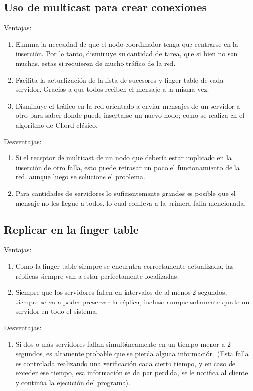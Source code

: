 \documentclass[10pt, a4paper]{article}
\begin{document}
    \subsection{Uso de multicast para crear conexiones}
    Ventajas:
    \begin{enumerate}
    	\item Elimina la necesidad de que el nodo coordinador tenga que centrarse en la inserción. Por lo tanto, disminuye su cantidad de tarea, que si bien no son muchas, estas si requieren de mucho tráfico de la red.
    	\item Facilita la actualización de la lista de sucesores y finger table de cada servidor. Gracias a que todos reciben el mensaje a la misma vez.
    	\item Disminuye el tráfico en la red orientado a enviar mensajes de un servidor a otro para saber donde puede insertarse un nuevo nodo; como se realiza en el algoritmo de Chord clásico.
    \end{enumerate}
    Desventajas:
    \begin{enumerate}
    	\item Si el receptor de multicast de un nodo que debería estar implicado en la inserción de otro falla, esto puede retrasar un poco el funcionamiento de la red, aunque luego se solucione el problema.
    	\item Para cantidades de servidores lo suficientemente grandes es posible que el mensaje no les llegue a todos, lo cual conlleva a la primera falla mencionada.
    \end{enumerate}
    \subsection{Replicar en la finger table}
    Ventajas:
    \begin{enumerate}
    	\item Como la finger table siempre se encuentra correctamente actualizada, las réplicas siempre van a estar perfectamente localizadas.
    	\item Siempre que los servidores fallen en intervalos de al menos 2 segundos, siempre se va a poder preservar la réplica, incluso aunque solamente quede un servidor en todo el sistema.
    \end{enumerate}
    Desventajas:
    \begin{enumerate}
    	\item Si dos o más servidores fallan simultáneamente en un tiempo menor a 2 segundos, es altamente probable que se pierda alguna información. (Esta falla es controlada realizando una verificación cada cierto tiempo, y en caso de exceder ese tiempo, esa información se da por perdida, se le notifica al cliente y continúa la ejecución del programa).
    \end{enumerate}
 
    
    
    
    


\begin{thebibliography}{99}
    \end{thebibliography}
\end{document}
